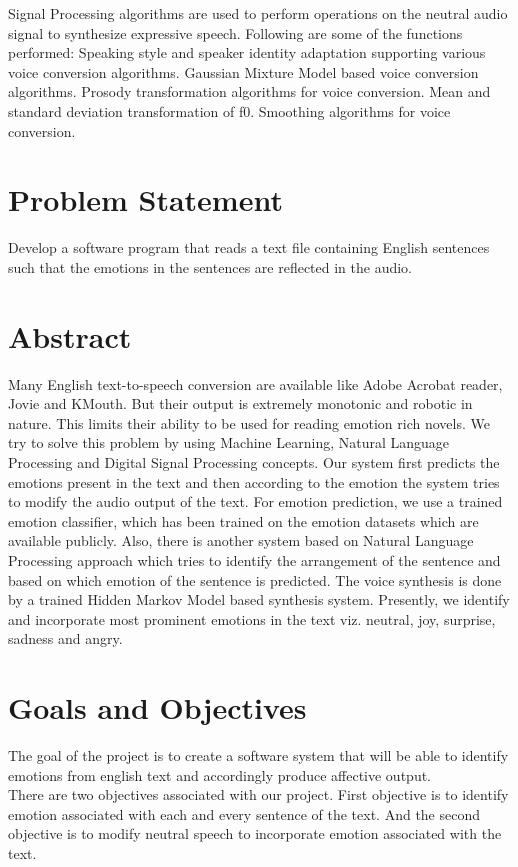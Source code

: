 \documentclass[oneside,a4paper,12pt]{book}
\begin{document}
\begin{enumerate}
\begin{enumerate}
\begin{enumerate}
\begin{enumerate}
						Signal Processing algorithms are used to perform operations on the neutral audio signal to synthesize expressive speech.
						Following are some of the functions performed:
						Speaking style and speaker identity adaptation supporting various voice conversion algorithms.
						Gaussian Mixture Model based voice conversion algorithms.
						Prosody transformation algorithms for voice conversion.
						Mean and standard deviation transformation of f0.
						Smoothing algorithms for voice conversion.
			\end{enumerate}
		\end{enumerate}
	\end{enumerate}		 
\end{enumerate} 



\section{Problem Statement}
\label{sec:problem}
         Develop a software program that reads a text file containing English sentences such that the emotions in the sentences are reflected in the audio.
\section{Abstract}
	 Many English text-to-speech conversion are available like Adobe Acrobat reader, Jovie and KMouth. But their output is extremely monotonic and robotic in nature. This limits their ability to be used for reading emotion rich novels. We try to solve this problem by using Machine Learning, Natural Language Processing and Digital Signal Processing concepts. Our system first predicts the emotions present in the text and then according to the emotion the system tries to modify the audio output of the text. For emotion prediction, we use a trained emotion classifier, which has been trained on the emotion datasets which are available publicly. Also, there is another system based on Natural Language Processing approach which tries to identify the arrangement of the sentence and based on which emotion of the sentence is predicted. The voice synthesis is done by a trained Hidden Markov Model based synthesis system. Presently, we identify and incorporate most prominent emotions in the text viz. neutral, joy, surprise, sadness and angry. 


\section{Goals and Objectives}
The goal of the project is to create a software system that will be able to identify emotions from english text and accordingly produce affective output.\\
There are two objectives associated with our project. First objective is to identify emotion associated with each and every sentence of the text. And the second objective is to modify neutral speech to incorporate emotion associated with the text.
	
\end{document}
